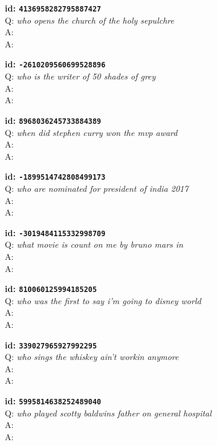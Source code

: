 \tiny{\setlength{\parindent}{0cm}
\textbf{id: \texttt{4136958282795887427}} \\
Q: \textit{who opens the church of the holy sepulchre} \\
A:  \\
A: }

\tiny{\setlength{\parindent}{0cm}
\textbf{id: \texttt{-2610209560699528896}} \\
Q: \textit{who is the writer of 50 shades of grey} \\
A:  \\
A: }

\tiny{\setlength{\parindent}{0cm}
\textbf{id: \texttt{8968036245733884389}} \\
Q: \textit{when did stephen curry won the mvp award} \\
A:  \\
A: }

\tiny{\setlength{\parindent}{0cm}
\textbf{id: \texttt{-1899514742808499173}} \\
Q: \textit{who are nominated for president of india 2017} \\
A:  \\
A: }

\tiny{\setlength{\parindent}{0cm}
\textbf{id: \texttt{-3019484115332998709}} \\
Q: \textit{what movie is count on me by bruno mars in} \\
A:  \\
A: }

\tiny{\setlength{\parindent}{0cm}
\textbf{id: \texttt{810060125994185205}} \\
Q: \textit{who was the first to say i'm going to disney world} \\
A:  \\
A: }

\tiny{\setlength{\parindent}{0cm}
\textbf{id: \texttt{339027965927992295}} \\
Q: \textit{who sings the whiskey ain't workin anymore} \\
A:  \\
A: }

\tiny{\setlength{\parindent}{0cm}
\textbf{id: \texttt{5995814638252489040}} \\
Q: \textit{who played scotty baldwins father on general hospital} \\
A:  \\
A: }

